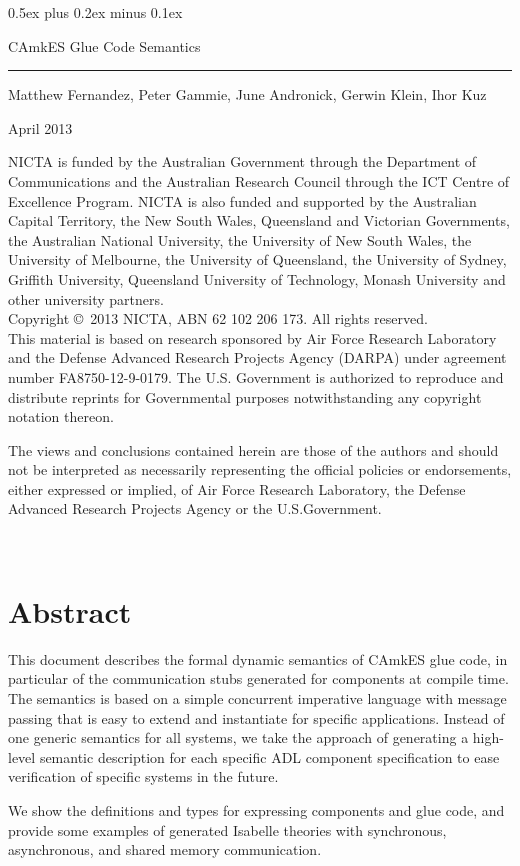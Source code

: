 \documentclass[11pt,a4paper]{scrreprt}
\date{\small\today}
\date{}
\newcommand{\camkes}{CAmkES\xspace}
\newcommand{\titl}{CAmkES Glue Code Semantics}
\newcommand{\authors}{Matthew Fernandez, Peter Gammie, June Andronick, Gerwin Klein, Ihor Kuz}
\newcommand{\nictafundingacknowledgement}{%
NICTA is funded by the Australian Government through the Department of Communications and the Australian Research Council through the ICT Centre of Excellence Program. NICTA is also funded and supported by the Australian Capital Territory, the New South Wales, Queensland and Victorian Governments, the Australian National University, the University of New South Wales, the University of Melbourne, the University of Queensland, the University of Sydney, Griffith University, Queensland University of Technology, Monash University and other university partners.}
\newcommand{\ABN}{ABN 62 102 206 173}
\newcommand{\cpright}{Copyright \copyright\ 2013 NICTA, \ABN.  All rights reserved.}
\newcommand{\trdisclaimer}{%
This material is based on research sponsored by Air Force Research Laboratory
and the Defense Advanced Research Projects Agency (DARPA) under agreement number
FA8750-12-9-0179. The U.S. Government is authorized to reproduce and distribute
reprints for Governmental purposes notwithstanding any copyright notation
thereon.

The views and conclusions contained herein are those of the authors and should
not be interpreted as necessarily representing the official policies or
endorsements, either expressed or implied, of Air Force Research Laboratory,
the Defense Advanced Research Projects Agency or the U.S.Government.}
\newcommand{\smalldisclaimer}{}
\newcommand{\bigdisclaimer}{%
\nictafundingacknowledgement\\

\cpright\\

\vspace{2ex}
\noindent\trdisclaimer}
\newcommand{\pgstyle}{%
\fancyhf{}%
\renewcommand{\headrulewidth}{0pt}%
\fancyfoot[C]{}%
\fancyfoot[L]{\smalldisclaimer}%
\fancyfoot[R]{\sl\thepage}}
\begin{document}
\parindent 0pt\parskip 0.5ex plus 0.2ex minus 0.1ex


\vspace{14ex}
\textsf{\huge \titl}


\vspace{4ex}
\rule{0.85\textwidth}{5pt}
\vspace{4ex}

{\large \authors

\vspace{2ex}
April 2013}

\vfill
{\small
\bigdisclaimer
}

\thispagestyle{empty}
\newpage
~
\restoregeometry

\fancypagestyle{empty}{\pgstyle}
\pagestyle{empty}


\cleardoublepage

\chapter*{Abstract}

This document describes the formal dynamic semantics of \camkes glue code, in
particular of the communication stubs generated for components at compile
time. The semantics is based on a simple concurrent imperative language with
message passing that is easy to extend and instantiate for specific
applications. Instead of one generic semantics for all systems, we take the
approach of generating a high-level semantic description for each specific
ADL component specification to ease verification of specific systems in
the future.

We show the definitions and types for expressing components and glue code, and
provide some examples of generated Isabelle theories with synchronous,
asynchronous, and shared memory communication.


\cleardoublepage
\tableofcontents







\end{document}
